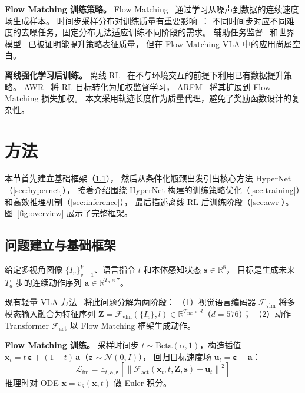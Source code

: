 \documentclass[10pt,twocolumn]{ctexart}
\begin{document}
\textbf{Flow Matching 训练策略。}
Flow Matching~\cite{lipman2022flow} 通过学习从噪声到数据的连续速度场生成样本。
时间步采样分布对训练质量有重要影响~\cite{esser2024sd3}：
不同时间步对应不同难度的去噪任务，固定分布无法适应训练不同阶段的需求。
辅助任务监督~\cite{jaderberg2017reinforcement} 和世界模型~\cite{ha2018world} 已被证明能提升策略表征质量，
但在 Flow Matching VLA 中的应用尚属空白。

\textbf{离线强化学习后训练。}
离线 RL~\cite{levine2020offline} 在不与环境交互的前提下利用已有数据提升策略。
AWR~\cite{peng2019awr} 将 RL 目标转化为加权监督学习，
ARFM~\cite{zhou2024arfm} 将其扩展到 Flow Matching 损失加权。
本文采用轨迹长度作为质量代理，避免了奖励函数设计的复杂性。

\section{方法}

本节首先建立基础框架（\ref{sec:prelim}），
然后从条件化瓶颈出发引出核心方法 HyperNet（\ref{sec:hypernet}），
接着介绍围绕 HyperNet 构建的训练策略优化（\ref{sec:training}）和高效推理机制（\ref{sec:inference}），
最后描述离线 RL 后训练阶段（\ref{sec:awr}）。
图~\ref{fig:overview} 展示了完整框架。

\subsection{问题建立与基础框架}\label{sec:prelim}

给定多视角图像 $\{I_v\}_{v=1}^V$、语言指令 $l$ 和本体感知状态 $\mathbf{s} \in \mathbb{R}^8$，
目标是生成未来 $T_a$ 步的连续动作序列 $\mathbf{a} \in \mathbb{R}^{T_a \times 7}$。

现有轻量 VLA 方法~\cite{simvla2024} 将此问题分解为两阶段：
（1）视觉语言编码器 $\mathcal{F}_\text{vlm}$ 将多模态输入融合为特征序列
$\mathbf{Z} = \mathcal{F}_\text{vlm}(\{I_v\}, l) \in \mathbb{R}^{T_\text{enc} \times d}$（$d=576$）；
（2）动作 Transformer $\mathcal{F}_\text{act}$ 以 Flow Matching 框架生成动作。

\textbf{Flow Matching 训练。}
采样时间步 $t \sim \text{Beta}(\alpha, 1)$，构造插值
$\mathbf{x}_t = t\,\boldsymbol{\varepsilon} + (1-t)\,\mathbf{a}$（$\boldsymbol{\varepsilon} \sim \mathcal{N}(0,I)$），
回归目标速度场 $\mathbf{u}_t = \boldsymbol{\varepsilon} - \mathbf{a}$：
\begin{equation}\label{eq:fm_loss}
    \mathcal{L}_\text{fm} = \mathbb{E}_{t,\mathbf{a},\boldsymbol{\varepsilon}}\!\left[\left\|\mathcal{F}_\text{act}(\mathbf{x}_t, t, \mathbf{Z}, \mathbf{s}) - \mathbf{u}_t\right\|^2\right]
\end{equation}
推理时对 ODE $\dot{\mathbf{x}} = v_\theta(\mathbf{x}, t)$ 做 Euler 积分。
\end{document}

